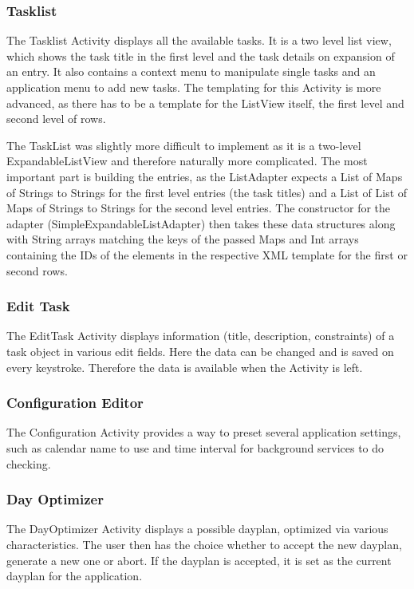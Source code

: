 
\subsubsection{Tasklist} %
\label{ssub:Tasklist}
The Tasklist Activity displays all the available tasks. It is a two level
list view, which shows the task title in the first level and the task details
on expansion of an entry. It also contains a context menu to manipulate single
tasks and an application menu to add new tasks. The templating for this
Activity is more advanced, as there has to be a template for the ListView
itself, the first level and second level of rows.

The TaskList was slightly more difficult to implement as it is a two-level
ExpandableListView and therefore naturally more complicated. The most important
part is building the entries, as the ListAdapter expects a List of Maps of
Strings to Strings for the first level entries (the task titles) and a List
of List of Maps of Strings to Strings for the second level entries. The
constructor for the adapter (SimpleExpandableListAdapter) then takes these
data structures along with String arrays matching the keys of the passed Maps
and Int arrays containing the IDs of the elements in the respective XML
template for the first or second rows.


\subsubsection{Edit Task} %
\label{ssub:EditTask}
The EditTask Activity displays information (title, description, constraints)
of a task object in various edit fields. Here the data can be changed and
is saved on every keystroke. Therefore the data is available when the
Activity is left.


\subsubsection{Configuration Editor} %
\label{ssub:ConfigurationEditor}
The Configuration Activity provides a way to preset several application
settings, such as calendar name to use and time interval for background
services to do checking.


\subsubsection{Day Optimizer} %
\label{ssub:DayOptimizer}
The DayOptimizer Activity displays a possible dayplan, optimized via various
characteristics. The user then has the choice whether to accept the new
dayplan, generate a new one or abort. If the dayplan is accepted, it is set
as the current dayplan for the application.


